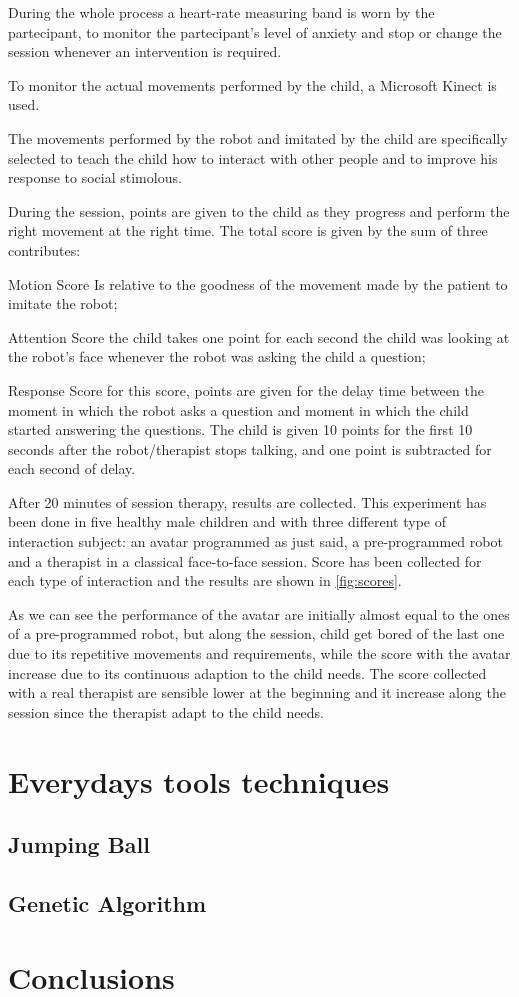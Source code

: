\documentclass[12pt,journal,draftclsnofoot,onecolumn]{IEEEtran}
\begin{document}
During the whole process a heart-rate measuring band is worn by the partecipant, to monitor the partecipant's level of anxiety and stop or change the session whenever an intervention is required.

To monitor the actual movements performed by the child, a Microsoft Kinect is used.

The movements performed by the robot and imitated by the child are specifically selected to teach the child how to interact with other people and to improve his response to social stimolous.

During the session, points are given to the child as they progress and perform the right movement at the right time.
The total score is given by the sum of three contributes:

\begin{LaTeXdescription}
	\item[Motion Score] Is relative to the goodness of the movement made by the patient to imitate the robot;
	\item[Attention Score] the child takes one point for each second the child was looking at the robot’s face whenever the robot was asking the child a question;
	\item[Response Score] for this score, points are given for the delay time between the moment in which the robot asks a question and moment in which the child started answering the questions. The child is given 10 points for the first 10 seconds after the robot/therapist stops talking, and one point is subtracted for each second of delay.
\end{LaTeXdescription}

After 20 minutes of session therapy, results are collected.
This experiment has been done in five healthy male children and with three different type of interaction subject: an avatar programmed as just said, a pre-programmed robot and a therapist in a classical face-to-face session. Score has been collected for each type of interaction and the results are shown in \autoref{fig:scores}.

As we can see the performance of the avatar are initially almost equal to the ones of a pre-programmed robot, but along the session, child get bored of the last one due to its repetitive movements and requirements, while the score with the avatar increase due to its continuous adaption to the child needs.
The score collected with a real therapist are sensible lower at the beginning and it increase along the session since the therapist adapt to the child needs.
\section{Everydays tools techniques}
\label{sec:every_tech}

\subsection{Jumping Ball}
\subsection{Genetic Algorithm}

\section{Conclusions}\label{sec:conclusions}



\end{document}
